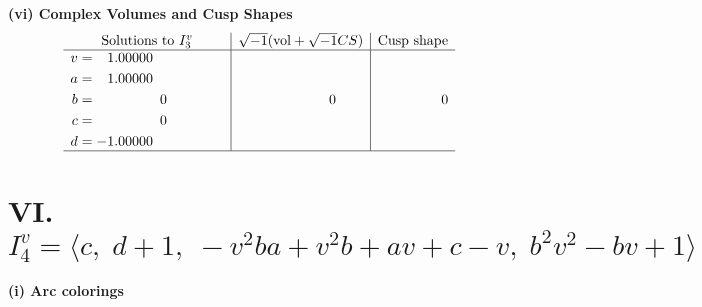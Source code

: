 \documentclass[1p]{elsarticle_modified}
\theoremstyle{definition}
\newcommand{\I}{\sqrt{-1}}
\begin{document}
\newpage\flushleft \textbf{(vi) Complex Volumes and Cusp Shapes}
$$\begin{array}{c|c|c}  
\text{Solutions to }I^v_{3}& \I (\text{vol} + \sqrt{-1}CS) & \text{Cusp shape}\\
 \hline 
\begin{aligned}
v &= \phantom{-}1.00000\phantom{ +0.000000I} \\
a &= \phantom{-}1.00000\phantom{ +0.000000I} \\
b &= \phantom{-0.000000 } 0 \\
c &= \phantom{-0.000000 } 0 \\
d &= -1.00000\phantom{ +0.000000I}\end{aligned}
 & \phantom{-0.000000 } 0 & \phantom{-0.000000 } 0\\
 \hline 
 \end{array}$$\newpage\newpage\renewcommand{\arraystretch}{1}
\centering \section*{VI. $I^v_{4}= \langle c,\;d+1,\;- v^2 b a+v^2 b+a v+c- v,\;b^2 v^2- b v+1 \rangle$}
\flushleft \textbf{(i) Arc colorings}\\
\end{document}
